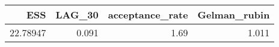 \begin{longtable}{rrrr}
\toprule
ESS & LAG\_30 & acceptance\_rate & Gelman\_rubin \\ 
\midrule
22.78947 & 0.091 & 1.69 & 1.011 \\ 
\bottomrule
\end{longtable}

